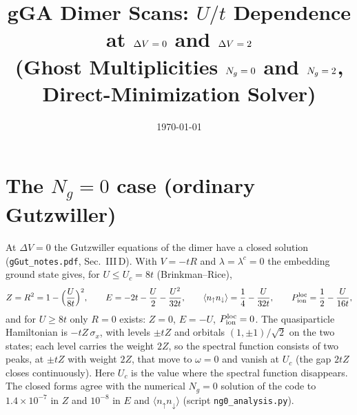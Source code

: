 \documentclass[11pt]{article}
\title{gGA Dimer Scans: $U/t$ Dependence at $\dV=0$ and $\dV=2$\\
\large (Ghost Multiplicities $\Ng=0$ and $\Ng=2$, Direct-Minimization Solver)}
\author{}
\date{\today}
\newcommand{\Ng}{N_{g}}
\newcommand{\dV}{\Delta V}
\begin{document}
\maketitle
\tableofcontents

\bigskip

\section{The $\Ng=0$ case (ordinary Gutzwiller)}
\label{sec:ng0}

At $\dV=0$ the Gutzwiller equations of the dimer have a closed solution (\texttt{gGut\_notes.pdf}, Sec.~III\,D). With $V=-tR$ and $\lambda=\lambda^c=0$ the embedding ground state gives, for $U\le U_c=8t$ (Brinkman--Rice),
\begin{equation}
  Z=R^2=1-\Bigl(\frac{U}{8t}\Bigr)^2,\qquad
  E=-2t-\frac U2-\frac{U^2}{32t},\qquad
  \langle n_\uparrow n_\downarrow\rangle=\frac14-\frac{U}{32t},\qquad
  P_{\rm ion}^{\rm loc}=\frac12-\frac{U}{16t},
\end{equation}
and for $U\ge8t$ only $R=0$ exists: $Z=0$, $E=-U$, $P_{\rm ion}^{\rm loc}=0$. The quasiparticle Hamiltonian is $-tZ\,\sigma_x$, with levels $\pm tZ$ and orbitals $(1,\pm1)/\sqrt2$ on the two states; each level carries the weight $2Z$, so the spectral function consists of two peaks, at $\pm tZ$ with weight $2Z$,
that move to $\omega=0$ and vanish at $U_c$ (the gap $2tZ$ closes continuously). Here $U_c$ is the value where the spectral function disappears. The closed forms agree with the numerical $\Ng=0$ solution of the code to $1.4\times10^{-7}$ in $Z$ and $10^{-8}$ in $E$ and $\langle n_\uparrow n_\downarrow\rangle$ (script \texttt{ng0\_analysis.py}).
\end{document}
